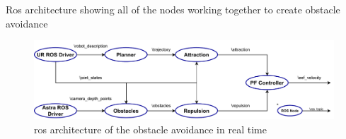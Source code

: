 \par Ros architecture showing all of the nodes working together to create obstacle avoidance

\begin{figure}[h]
    \centering
    \includegraphics[width=\linewidth]{figs/chp4/ros_obstacle_arch.pdf}
    \caption{\ac{ros} architecture of the obstacle avoidance in real time}
    \label{fig:ros_obstacle_arch}
\end{figure}